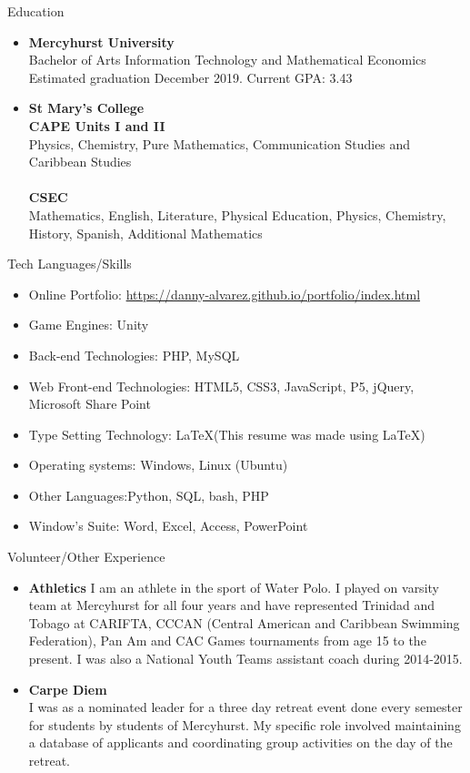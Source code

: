 \documentclass[11pt]{resume} %
\newcommand{\bold}[1]{\textbf{#1}}
\begin{document}
\begin{rSection}{Education}

\begin{itemize}
	\item\bold{Mercyhurst University}\\
	Bachelor of Arts Information Technology and  Mathematical Economics\\
	Estimated graduation December 2019. \quad Current GPA: 3.43\\
	
	\item\bold{St Mary’s College}\\
	\bold{CAPE Units I and II}\\
	Physics, Chemistry, Pure Mathematics, Communication Studies and Caribbean Studies\\
	\\
	\bold{CSEC}\\
	Mathematics, English, Literature, Physical Education, Physics, Chemistry, History, Spanish, Additional Mathematics\\
\end{itemize}
\end{rSection}
\vspace{1in}
\begin{rSection}{Tech Languages/Skills}
\begin{itemize}
	\item Online Portfolio: \url{https://danny-alvarez.github.io/portfolio/index.html}
	\item Game Engines: Unity
	\item Back-end Technologies: PHP, MySQL
	\item Web Front-end Technologies: HTML5, CSS3, JavaScript, P5, jQuery, Microsoft Share Point
	\item Type Setting Technology: \LaTeX\xspace (This resume was made using \LaTeX)
	\item Operating systems: Windows, Linux (Ubuntu)
	\item Other Languages:Python, SQL, bash, PHP
	\item Window's Suite: Word, Excel, Access, PowerPoint
\end{itemize}
\end{rSection}


\begin{rSection}{Volunteer/Other Experience}
	\begin{itemize}
		\item\bold{Athletics}
		I am an athlete in the sport of Water Polo. I played on varsity team at Mercyhurst for all four years and have represented Trinidad and Tobago at CARIFTA, CCCAN (Central American and Caribbean Swimming Federation), Pan Am and CAC Games tournaments from age 15 to the present. I was also a National Youth Teams assistant coach during 2014-2015. 
		\item\bold{Carpe Diem}\\
		I was as a nominated leader for a three day retreat event done every semester for students by students of Mercyhurst. My specific role involved maintaining a database of applicants and coordinating group activities on the day of the retreat. 
	\end{itemize}
\end{rSection}
\end{document}
